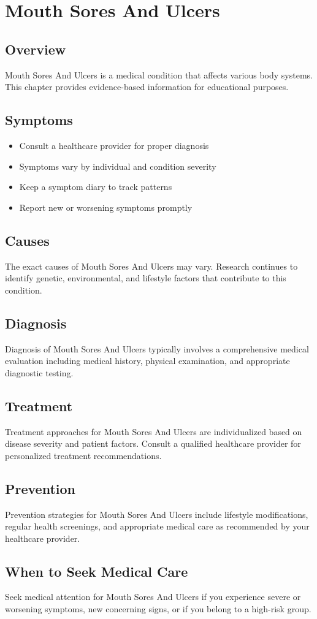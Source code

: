\chapter{Mouth Sores And Ulcers}

\section*{Overview}
Mouth Sores And Ulcers is a medical condition that affects various body systems. This chapter provides evidence-based information for educational purposes.

\section*{Symptoms}
\begin{itemize}
  \item Consult a healthcare provider for proper diagnosis
  \item Symptoms vary by individual and condition severity
  \item Keep a symptom diary to track patterns
  \item Report new or worsening symptoms promptly
\end{itemize}

\section*{Causes}
The exact causes of Mouth Sores And Ulcers may vary. Research continues to identify genetic, environmental, and lifestyle factors that contribute to this condition.

\section*{Diagnosis}
Diagnosis of Mouth Sores And Ulcers typically involves a comprehensive medical evaluation including medical history, physical examination, and appropriate diagnostic testing.

\section*{Treatment}
Treatment approaches for Mouth Sores And Ulcers are individualized based on disease severity and patient factors. Consult a qualified healthcare provider for personalized treatment recommendations.

\section*{Prevention}
Prevention strategies for Mouth Sores And Ulcers include lifestyle modifications, regular health screenings, and appropriate medical care as recommended by your healthcare provider.

\section*{When to Seek Medical Care}
Seek medical attention for Mouth Sores And Ulcers if you experience severe or worsening symptoms, new concerning signs, or if you belong to a high-risk group.
\clearpage
